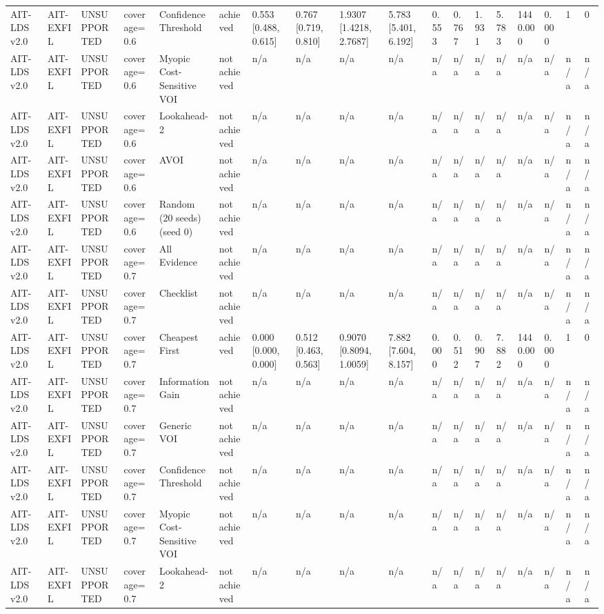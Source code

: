 \begin{table}[!ht]
{\begin{tabular}{llllllllllllllllll}
AIT-LDS v2.0 & AIT-EXFIL & UNSUPPORTED & coverage=0.6 & Confidence Threshold & achieved & 0.553 [0.488, 0.615] & 0.767 [0.719, 0.810] & 1.9307 [1.4218, 2.7687] & 5.783 [5.401, 6.192] & 0.553 & 0.767 & 1.931 & 5.783 & 1440.000 & 0.000 & 1 & 0 \\
AIT-LDS v2.0 & AIT-EXFIL & UNSUPPORTED & coverage=0.6 & Myopic Cost-Sensitive VOI & not achieved & n/a & n/a & n/a & n/a & n/a & n/a & n/a & n/a & n/a & n/a & n/a & n/a \\
AIT-LDS v2.0 & AIT-EXFIL & UNSUPPORTED & coverage=0.6 & Lookahead-2 & not achieved & n/a & n/a & n/a & n/a & n/a & n/a & n/a & n/a & n/a & n/a & n/a & n/a \\
AIT-LDS v2.0 & AIT-EXFIL & UNSUPPORTED & coverage=0.6 & AVOI & not achieved & n/a & n/a & n/a & n/a & n/a & n/a & n/a & n/a & n/a & n/a & n/a & n/a \\
AIT-LDS v2.0 & AIT-EXFIL & UNSUPPORTED & coverage=0.6 & Random (20 seeds) (seed 0) & not achieved & n/a & n/a & n/a & n/a & n/a & n/a & n/a & n/a & n/a & n/a & n/a & n/a \\
AIT-LDS v2.0 & AIT-EXFIL & UNSUPPORTED & coverage=0.7 & All Evidence & not achieved & n/a & n/a & n/a & n/a & n/a & n/a & n/a & n/a & n/a & n/a & n/a & n/a \\
AIT-LDS v2.0 & AIT-EXFIL & UNSUPPORTED & coverage=0.7 & Checklist & not achieved & n/a & n/a & n/a & n/a & n/a & n/a & n/a & n/a & n/a & n/a & n/a & n/a \\
AIT-LDS v2.0 & AIT-EXFIL & UNSUPPORTED & coverage=0.7 & Cheapest First & achieved & 0.000 [0.000, 0.000] & 0.512 [0.463, 0.563] & 0.9070 [0.8094, 1.0059] & 7.882 [7.604, 8.157] & 0.000 & 0.512 & 0.907 & 7.882 & 1440.000 & 0.000 & 1 & 0 \\
AIT-LDS v2.0 & AIT-EXFIL & UNSUPPORTED & coverage=0.7 & Information Gain & not achieved & n/a & n/a & n/a & n/a & n/a & n/a & n/a & n/a & n/a & n/a & n/a & n/a \\
AIT-LDS v2.0 & AIT-EXFIL & UNSUPPORTED & coverage=0.7 & Generic VOI & not achieved & n/a & n/a & n/a & n/a & n/a & n/a & n/a & n/a & n/a & n/a & n/a & n/a \\
AIT-LDS v2.0 & AIT-EXFIL & UNSUPPORTED & coverage=0.7 & Confidence Threshold & not achieved & n/a & n/a & n/a & n/a & n/a & n/a & n/a & n/a & n/a & n/a & n/a & n/a \\
AIT-LDS v2.0 & AIT-EXFIL & UNSUPPORTED & coverage=0.7 & Myopic Cost-Sensitive VOI & not achieved & n/a & n/a & n/a & n/a & n/a & n/a & n/a & n/a & n/a & n/a & n/a & n/a \\
AIT-LDS v2.0 & AIT-EXFIL & UNSUPPORTED & coverage=0.7 & Lookahead-2 & not achieved & n/a & n/a & n/a & n/a & n/a & n/a & n/a & n/a & n/a & n/a & n/a & n/a \\

\end{tabular}}
\end{table}
